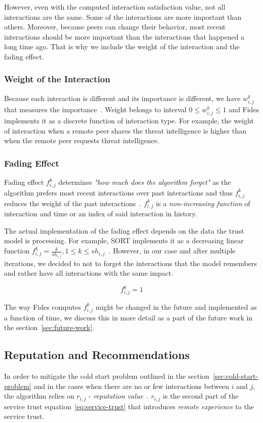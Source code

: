 However, even with the computed interaction satisfaction value, not all interactions are the same. 
Some of the interactions are more important than others. 
Moreover, because peers can change their behavior, most recent interactions should be more important than the interactions that happened a long time ago.
That is why we include the weight of the interaction and the fading effect.

\subsubsection{Weight of the Interaction}
Because each interaction is different and its importance is different, we have $w^{k}_{i,j}$ that measures the importance~\cite{sort}.
Weight belongs to interval $0 \leq w^{k}_{i,j} \leq 1$ and Fides implements it as a discrete function of interaction type. 
For example, the weight of interaction when a remote peer shares the threat intelligence is higher than when the remote peer requests threat intelligence.


\subsubsection{Fading Effect}
\label{subsubsec:fading-effect}
Fading effect $f^{k}_{i,j}$ determines \textit{"how much does the algorithm forget"} as the algorithm prefers most recent interactions over past interactions and thus $f^{k}_{i,j}$ reduces the weight of the past interactions~\cite{sort}. 
$f^{k}_{i,j}$ is a \textit{non-increasing function} of interaction and time or an index of said interaction in history.

The actual implementation of the fading effect depends on the data the trust model is processing.
For example, SORT implements it as a decreasing linear function $f^{k}_{i,j} = \frac{k}{sh_{i,j}}, 1 \leq k \leq sh_{i,j}$~\cite{sort}.
However, in our case and after multiple iterations, we decided to not to forget the interactions that the model remembers and rather have all interactions with the same impact.

\begin{equation}
    f^{k}_{i,j} =1
\end{equation}

\noindent
The way Fides computes $f^{k}_{i,j}$ might be changed in the future and implemented as a function of time, we discuss this in more detail as a part of the future work in the section~\ref{sec:future-work}.

\subsection{Reputation and Recommendations}
In order to mitigate the cold start problem outlined in the section~\ref{sec:cold-start-problem} and in the cases when there are no or few interactions between $i$ and $j$, the algorithm relies on $r_{i,j}$ - \textit{reputation value}~\cite{sort}.
$r_{i,j}$ is the second part of the service trust equation~\ref{eq:service-trust} that introduces \textit{remote experience} to the service trust.

